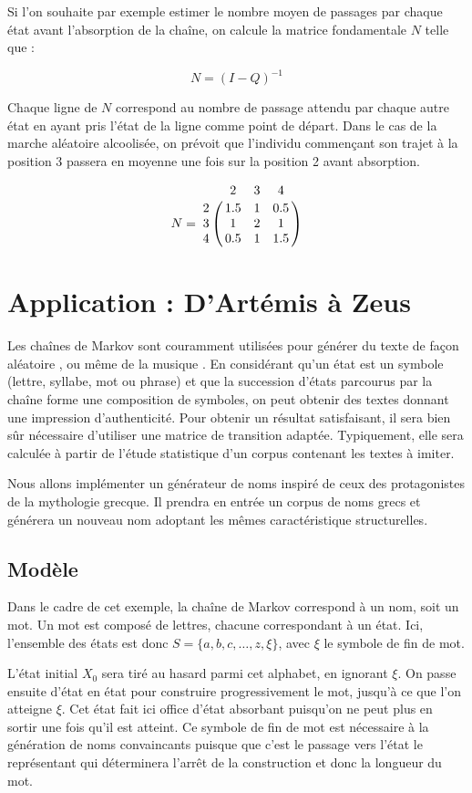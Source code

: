 \documentclass[12pt]{article}
\begin{document}
Si l'on souhaite par exemple estimer le nombre moyen de passages par
chaque état avant l'absorption de la chaîne, on calcule la matrice
fondamentale $N$ telle que :

$$
N = (I - Q)^{-1}
$$

Chaque ligne de $N$ correspond au nombre de passage attendu par chaque
autre état en ayant pris l'état de la ligne comme point de
départ. Dans le cas de la marche aléatoire alcoolisée, on prévoit que
l'individu commençant son trajet à la position 3 passera en moyenne
une fois sur la position 2 avant absorption.

$$
N =
\bordermatrix{
  & 2 & 3 & 4 \cr
  2 & 1.5 & 1 & 0.5 \cr
  3 & 1 & 2 & 1 \cr
  4 & 0.5 & 1 & 1.5
}
$$

\section{Application : D'Artémis à Zeus}

Les chaînes de Markov sont couramment utilisées pour générer du texte
de façon aléatoire \cite{shan}, ou même de la musique \cite{conk}. En
considérant qu'un état est un symbole (lettre, syllabe, mot ou phrase)
et que la succession d'états parcourus par la chaîne forme une
composition de symboles, on peut obtenir des textes donnant une
impression d'authenticité. Pour obtenir un résultat satisfaisant, il
sera bien sûr nécessaire d'utiliser une matrice de transition
adaptée. Typiquement, elle sera calculée à partir de l'étude
statistique d'un corpus contenant les textes à imiter.

Nous allons implémenter un générateur de noms inspiré de ceux des
protagonistes de la mythologie grecque. Il prendra en entrée un corpus
de noms grecs et générera un nouveau nom adoptant les mêmes
caractéristique structurelles.

\subsection{Modèle}

Dans le cadre de cet exemple, la chaîne de Markov correspond à un nom,
soit un mot. Un mot est composé de lettres, chacune correspondant à un
état. Ici, l'ensemble des états est donc $S = \{a, b, c, \dots, z, \xi
\}$, avec $\xi$ le symbole de fin de mot.

L'état initial $X_0$ sera tiré au hasard parmi cet alphabet, en
ignorant $\xi$. On passe ensuite d'état en état pour construire
progressivement le mot, jusqu'à ce que l'on atteigne $\xi$. Cet état
fait ici office d'état absorbant puisqu'on ne peut plus en sortir une
fois qu'il est atteint. Ce symbole de fin de mot est nécessaire à la
génération de noms convaincants puisque que c'est le passage vers
l'état le représentant qui déterminera l'arrêt de la construction et
donc la longueur du mot.
\end{document}
